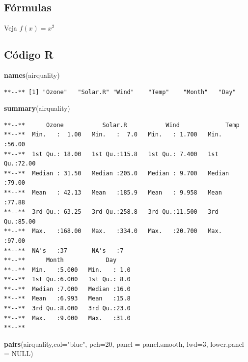\documentclass[12pt,brazil,]{article}
\newenvironment{Shaded}{\begin{snugshade}}{\end{snugshade}}
\newcommand{\DataTypeTok}[1]{\textcolor[rgb]{0.13,0.29,0.53}{#1}}
\newcommand{\DecValTok}[1]{\textcolor[rgb]{0.00,0.00,0.81}{#1}}
\newcommand{\KeywordTok}[1]{\textcolor[rgb]{0.13,0.29,0.53}{\textbf{#1}}}
\newcommand{\NormalTok}[1]{#1}
\newcommand{\OtherTok}[1]{\textcolor[rgb]{0.56,0.35,0.01}{#1}}
\newcommand{\StringTok}[1]{\textcolor[rgb]{0.31,0.60,0.02}{#1}}
\begin{document}
\hypertarget{fuxf3rmulas}{%
\subsection{Fórmulas}\label{fuxf3rmulas}}

Veja \(f(x)=x^2\)

\hypertarget{cuxf3digo-r}{%
\subsection{Código R}\label{cuxf3digo-r}}

\begin{Shaded}
\begin{Highlighting}[]
\KeywordTok{names}\NormalTok{(airquality)}
\end{Highlighting}
\end{Shaded}

\begin{verbatim}
**--** [1] "Ozone"   "Solar.R" "Wind"    "Temp"    "Month"   "Day"
\end{verbatim}

\begin{Shaded}
\begin{Highlighting}[]
\KeywordTok{summary}\NormalTok{(airquality)}
\end{Highlighting}
\end{Shaded}

\begin{verbatim}
**--**      Ozone           Solar.R           Wind             Temp      
**--**  Min.   :  1.00   Min.   :  7.0   Min.   : 1.700   Min.   :56.00  
**--**  1st Qu.: 18.00   1st Qu.:115.8   1st Qu.: 7.400   1st Qu.:72.00  
**--**  Median : 31.50   Median :205.0   Median : 9.700   Median :79.00  
**--**  Mean   : 42.13   Mean   :185.9   Mean   : 9.958   Mean   :77.88  
**--**  3rd Qu.: 63.25   3rd Qu.:258.8   3rd Qu.:11.500   3rd Qu.:85.00  
**--**  Max.   :168.00   Max.   :334.0   Max.   :20.700   Max.   :97.00  
**--**  NA's   :37       NA's   :7                                       
**--**      Month            Day      
**--**  Min.   :5.000   Min.   : 1.0  
**--**  1st Qu.:6.000   1st Qu.: 8.0  
**--**  Median :7.000   Median :16.0  
**--**  Mean   :6.993   Mean   :15.8  
**--**  3rd Qu.:8.000   3rd Qu.:23.0  
**--**  Max.   :9.000   Max.   :31.0  
**--** 
\end{verbatim}

\begin{Shaded}
\begin{Highlighting}[]
\KeywordTok{pairs}\NormalTok{(airquality,}\DataTypeTok{col=}\StringTok{"blue"}\NormalTok{, }\DataTypeTok{pch=}\DecValTok{20}\NormalTok{,}
      \DataTypeTok{panel =}\NormalTok{ panel.smooth, }\DataTypeTok{lwd=}\DecValTok{3}\NormalTok{, }\DataTypeTok{lower.panel =} \OtherTok{NULL}\NormalTok{)}
\end{Highlighting}
\end{Shaded}
\end{document}

